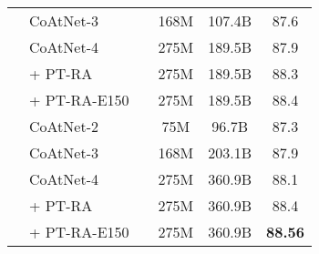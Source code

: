 \documentclass{article}
\newcommand{\name}{CoAtNet\xspace}
\begin{document}
\begin{table}[!ht]
\begin{tabular}{c l c c c c}
        & \name-3 &  & 168M & 107.4B & 87.6 \\
        & \name-4 &  & 275M & 189.5B & 87.9 \\
        & \quad + PT-RA &  & 275M & 189.5B & 88.3 \\
        & \quad + PT-RA-E150 &  & 275M & 189.5B & 88.4 \\
        \cmidrule(r){2-2} \cmidrule(lr){3-3} \cmidrule(lr){4-5} \cmidrule(l){6-6}
        & \name-2 &  & 75M  & 96.7B & 87.3 \\
        & \name-3 &  & 168M & 203.1B  & 87.9 \\
        & \name-4 &  & 275M & 360.9B & 88.1 \\
        & \quad + PT-RA &  & 275M & 360.9B & 88.4 \\
        & \quad + PT-RA-E150 &  & 275M & 360.9B & \bf 88.56 \\
        \bottomrule
    \end{tabular}
    \label{tab:21k_result}
\end{table}
\end{document}
